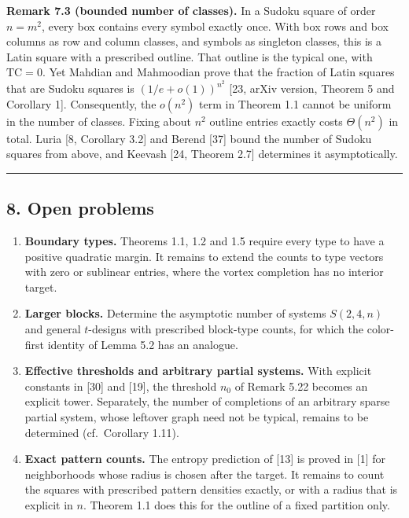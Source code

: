 \documentclass[english,11pt,a4paper]{article}
\providecommand{\tightlist}{\setlength{\itemsep}{0pt}\setlength{\parskip}{0pt}}
\begin{document}
\textbf{Remark 7.3 (bounded number of classes).} In a Sudoku square of order \(n=m^2\), every box contains every symbol exactly once. With box rows and box columns as row and column classes, and symbols as singleton classes, this is a Latin square with a prescribed outline. That outline is the typical one, with \(\mathrm{TC}=0\). Yet Mahdian and Mahmoodian prove that the fraction of Latin squares that are Sudoku squares is \((1/e+o(1))^{n^2}\) {[}23, arXiv version, Theorem 5 and Corollary 1{]}. Consequently, the \(o(n^2)\) term in Theorem 1.1 cannot be uniform in the number of classes. Fixing about \(n^2\) outline entries exactly costs \(\Theta(n^2)\) in total. Luria {[}8, Corollary 3.2{]} and Berend {[}37{]} bound the number of Sudoku squares from above, and Keevash {[}24, Theorem 2.7{]} determines it asymptotically.

\begin{center}\rule{0.5\linewidth}{0.5pt}\end{center}

\subsection{8. Open problems}\label{open-problems}

\begin{enumerate}
\def\labelenumi{\arabic{enumi}.}
\tightlist
\item
  \textbf{Boundary types.} Theorems 1.1, 1.2 and 1.5 require every type to have a positive quadratic margin. It remains to extend the counts to type vectors with zero or sublinear entries, where the vortex completion has no interior target.
\item
  \textbf{Larger blocks.} Determine the asymptotic number of systems \(S(2,4,n)\) and general \(t\)-designs with prescribed block-type counts, for which the color-first identity of Lemma 5.2 has an analogue.
\item
  \textbf{Effective thresholds and arbitrary partial systems.} With explicit constants in {[}30{]} and {[}19{]}, the threshold \(n_0\) of Remark 5.22 becomes an explicit tower. Separately, the number of completions of an arbitrary sparse partial system, whose leftover graph need not be typical, remains to be determined (cf.~Corollary 1.11).
\item
  \textbf{Exact pattern counts.} The entropy prediction of {[}13{]} is proved in {[}1{]} for neighborhoods whose radius is chosen after the target. It remains to count the squares with prescribed pattern densities exactly, or with a radius that is explicit in \(n\). Theorem 1.1 does this for the outline of a fixed partition only.
\end{enumerate}
\end{document}
